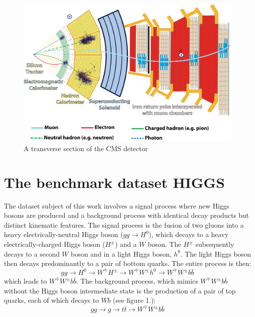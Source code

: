 \begin{figure}[H]
 \centering
 \includegraphics[scale=0.05]{figures/CMSslice.png}
 \caption{A transverse section of the CMS detector}
 \label{}
\end{figure}

\section{The benchmark dataset HIGGS}\label{data}%
The dataset subject of this work involves a signal process where new Higgs
bosons are produced and a background process with identical decay products
but distinct kinematic features.
The signal process is the fusion of two gluons into a heavy
electrically-neutral Higgs boson ($gg \rightarrow H^0$), which decays
to a heavy electrically-charged Higgs boson ($H^\pm$) and a $W$ boson.
The $H^\pm$ subsequently decays to a second $W$ boson and in a light Higgs
boson, $h^0$. The light Higgs boson then decays predominantly to a pair of
bottom quarks. The entire process is then:
\begin{equation}
 gg \rightarrow H^0 \rightarrow W^\mp H^\pm \rightarrow W^\mp W^\pm h^0
 \rightarrow W^\mp W^\pm b \bar{b}
\end{equation}
which leads to $W^\mp W^\pm b \bar{b}$. The background process, which
mimics $W^\mp W^\pm b \bar{b}$ without the Higgs boson intermediate state
is the production of a pair of top quarks, each of which decays to $Wb$
(see figure 1.):
\begin{equation}
 gg \rightarrow g \rightarrow t\bar{t} \rightarrow W^\mp W^\pm b \bar{b}
\end{equation}

